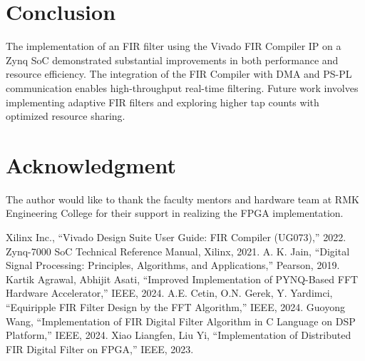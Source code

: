 \documentclass[conference]{IEEEtran}
\begin{document}
	\section{Conclusion}
	The implementation of an FIR filter using the Vivado FIR Compiler IP on a Zynq SoC demonstrated substantial improvements in both performance and resource efficiency. The integration of the FIR Compiler with DMA and PS-PL communication enables high-throughput real-time filtering. Future work involves implementing adaptive FIR filters and exploring higher tap counts with optimized resource sharing.
	
	\section*{Acknowledgment}
	The author would like to thank the faculty mentors and hardware team at RMK Engineering College for their support in realizing the FPGA implementation.
	
	\begin{thebibliography}{00}
		 Xilinx Inc., ``Vivado Design Suite User Guide: FIR Compiler (UG073),'' 2022.
		 Zynq-7000 SoC Technical Reference Manual, Xilinx, 2021.
		 A. K. Jain, ``Digital Signal Processing: Principles, Algorithms, and Applications,'' Pearson, 2019.
		 Kartik Agrawal, Abhijit Asati, ``Improved Implementation of PYNQ-Based FFT Hardware Accelerator,'' IEEE, 2024.
		 A.E. Cetin, O.N. Gerek, Y. Yardimci, ``Equiripple FIR Filter Design by the FFT Algorithm,'' IEEE, 2024.
		 Guoyong Wang, ``Implementation of FIR Digital Filter Algorithm in C Language on DSP Platform,'' IEEE, 2024.
		 Xiao Liangfen, Liu Yi, ``Implementation of Distributed FIR Digital Filter on FPGA,'' IEEE, 2023.
	\end{thebibliography}
	
	\vspace{12pt}
	
\end{document}
